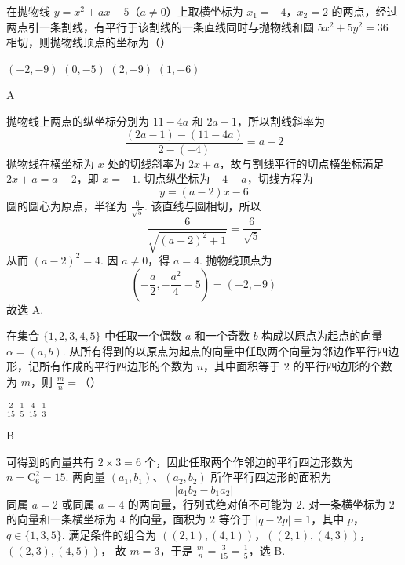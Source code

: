 \begin{problem}
在抛物线 \(y = x^2 + ax - 5\)（\(a \neq 0\)）上取横坐标为 \(x_1 = -4\)，\(x_2 = 2\) 的两点，经过两点引一条割线，有平行于该割线的一条直线同时与抛物线和圆 \(5x^2 + 5y^2 = 36\) 相切，则抛物线顶点的坐标为（\quad）

\choices
    {\((-2, -9)\)}
    {\((0, -5)\)}
    {\((2, -9)\)}
    {\((1, -6)\)}
\end{problem}

\begin{answer}
A
\end{answer}

\begin{solution}
抛物线上两点的纵坐标分别为 \(11-4a\) 和 \(2a-1\)，所以割线斜率为
\[
\frac{(2a-1)-(11-4a)}{2-(-4)}=a-2
\]
抛物线在横坐标为 \(x\) 处的切线斜率为 \(2x+a\)，故与割线平行的切点横坐标满足 \(2x+a=a-2\)，即 \(x=-1\). 切点纵坐标为 \(-4-a\)，切线方程为
\[
y=(a-2)x-6
\]
圆的圆心为原点，半径为 \(\frac{6}{\sqrt5}\). 该直线与圆相切，所以
\[
\frac{6}{\sqrt{(a-2)^2+1}}=\frac{6}{\sqrt5}
\]
从而 \((a-2)^2=4\). 因 \(a\ne0\)，得 \(a=4\). 抛物线顶点为
\[
\left(-\frac a2,-\frac{a^2}{4}-5\right)=(-2,-9)
\]
故选 A.
\end{solution}

\begin{problem}
在集合 \(\{1, 2, 3, 4, 5\}\) 中任取一个偶数 \(a\) 和一个奇数 \(b\) 构成以原点为起点的向量 \(\alpha = (a, b)\). 从所有得到的以原点为起点的向量中任取两个向量为邻边作平行四边形，记所有作成的平行四边形的个数为 \(n\)，其中面积等于 \(2\) 的平行四边形的个数为 \(m\)，则 \(\frac{m}{n} =\)（\quad）

\choices
    {\(\frac{2}{15}\)}
    {\(\frac{1}{5}\)}
    {\(\frac{4}{15}\)}
    {\(\frac{1}{3}\)}
\end{problem}

\begin{answer}
B
\end{answer}

\begin{solution}
可得到的向量共有 \(2\times3=6\) 个，因此任取两个作邻边的平行四边形数为 \(n=\mathrm C_6^2=15\). 两向量 \((a_1,b_1)\)、\((a_2,b_2)\) 所作平行四边形的面积为
\[
\left|a_1b_2-b_1a_2\right|
\]
同属 \(a=2\) 或同属 \(a=4\) 的两向量，行列式绝对值不可能为 \(2\). 对一条横坐标为 \(2\) 的向量和一条横坐标为 \(4\) 的向量，面积为 \(2\) 等价于 \(|q-2p|=1\)，其中 \(p\)，\(q\in\{1,3,5\}\). 满足条件的组合为
\(((2,1),(4,1))\)，\(((2,1),(4,3))\)，\(((2,3),(4,5))\)，
故 \(m=3\)，于是 \(\frac mn=\frac3{15}=\frac15\)，选 B.
\end{solution}

